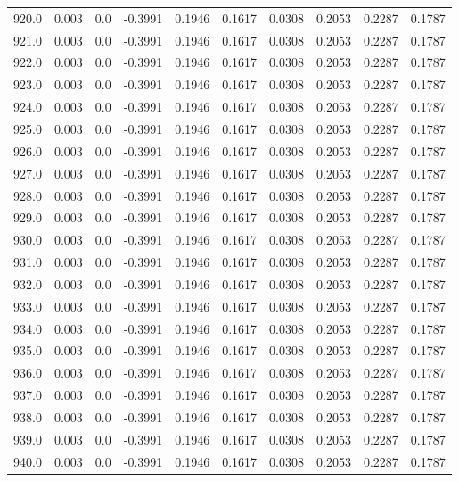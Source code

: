 \begin{longtable}{lrrrrrrrrr}
920.0 & 0.003 & 0.0 & -0.3991 & 0.1946 & 0.1617 & 0.0308 & 0.2053 & 0.2287 & 0.1787 \\
921.0 & 0.003 & 0.0 & -0.3991 & 0.1946 & 0.1617 & 0.0308 & 0.2053 & 0.2287 & 0.1787 \\
922.0 & 0.003 & 0.0 & -0.3991 & 0.1946 & 0.1617 & 0.0308 & 0.2053 & 0.2287 & 0.1787 \\
923.0 & 0.003 & 0.0 & -0.3991 & 0.1946 & 0.1617 & 0.0308 & 0.2053 & 0.2287 & 0.1787 \\
924.0 & 0.003 & 0.0 & -0.3991 & 0.1946 & 0.1617 & 0.0308 & 0.2053 & 0.2287 & 0.1787 \\
925.0 & 0.003 & 0.0 & -0.3991 & 0.1946 & 0.1617 & 0.0308 & 0.2053 & 0.2287 & 0.1787 \\
926.0 & 0.003 & 0.0 & -0.3991 & 0.1946 & 0.1617 & 0.0308 & 0.2053 & 0.2287 & 0.1787 \\
927.0 & 0.003 & 0.0 & -0.3991 & 0.1946 & 0.1617 & 0.0308 & 0.2053 & 0.2287 & 0.1787 \\
928.0 & 0.003 & 0.0 & -0.3991 & 0.1946 & 0.1617 & 0.0308 & 0.2053 & 0.2287 & 0.1787 \\
929.0 & 0.003 & 0.0 & -0.3991 & 0.1946 & 0.1617 & 0.0308 & 0.2053 & 0.2287 & 0.1787 \\
930.0 & 0.003 & 0.0 & -0.3991 & 0.1946 & 0.1617 & 0.0308 & 0.2053 & 0.2287 & 0.1787 \\
931.0 & 0.003 & 0.0 & -0.3991 & 0.1946 & 0.1617 & 0.0308 & 0.2053 & 0.2287 & 0.1787 \\
932.0 & 0.003 & 0.0 & -0.3991 & 0.1946 & 0.1617 & 0.0308 & 0.2053 & 0.2287 & 0.1787 \\
933.0 & 0.003 & 0.0 & -0.3991 & 0.1946 & 0.1617 & 0.0308 & 0.2053 & 0.2287 & 0.1787 \\
934.0 & 0.003 & 0.0 & -0.3991 & 0.1946 & 0.1617 & 0.0308 & 0.2053 & 0.2287 & 0.1787 \\
935.0 & 0.003 & 0.0 & -0.3991 & 0.1946 & 0.1617 & 0.0308 & 0.2053 & 0.2287 & 0.1787 \\
936.0 & 0.003 & 0.0 & -0.3991 & 0.1946 & 0.1617 & 0.0308 & 0.2053 & 0.2287 & 0.1787 \\
937.0 & 0.003 & 0.0 & -0.3991 & 0.1946 & 0.1617 & 0.0308 & 0.2053 & 0.2287 & 0.1787 \\
938.0 & 0.003 & 0.0 & -0.3991 & 0.1946 & 0.1617 & 0.0308 & 0.2053 & 0.2287 & 0.1787 \\
939.0 & 0.003 & 0.0 & -0.3991 & 0.1946 & 0.1617 & 0.0308 & 0.2053 & 0.2287 & 0.1787 \\
940.0 & 0.003 & 0.0 & -0.3991 & 0.1946 & 0.1617 & 0.0308 & 0.2053 & 0.2287 & 0.1787 \\

\end{longtable}
